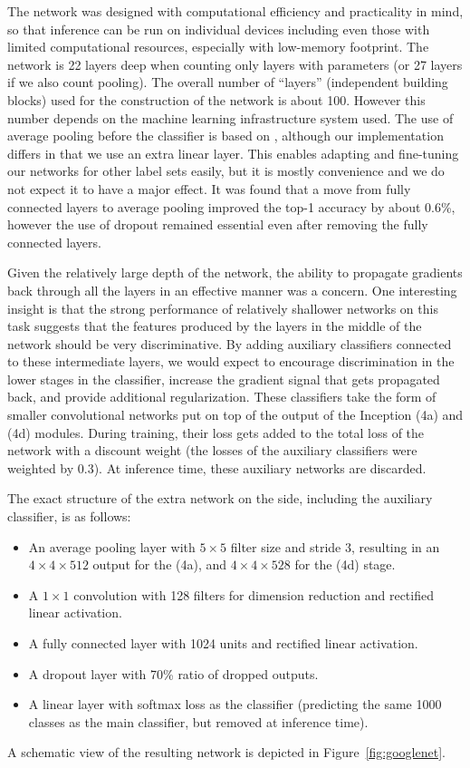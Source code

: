 The network was designed with computational efficiency and practicality in mind, so that inference can be run on individual devices including even those with limited computational resources, especially with low-memory footprint. The network is 22 layers deep when counting only layers with parameters (or 27 layers if we also count pooling). The overall number of “layers” (independent building blocks) used for the construction of the network is about 100. However this number depends on the machine learning infrastructure system used. The use of average pooling before the classifier is based on \cite{lin2013nin}, although our implementation differs in that we use an extra linear layer. This enables adapting and fine-tuning our networks for other label sets easily, but it is mostly convenience and we do not expect it to have a major effect. It was found that a move from fully connected layers to average pooling improved the top-1 accuracy by about 0.6\%, however the use of dropout remained essential even after removing the fully connected layers.

Given the relatively large depth of the network, the ability to propagate gradients back through all the layers in an effective manner was a concern. One interesting insight is that the strong performance of relatively shallower networks on this task suggests that the features produced by the layers in the middle of the network should be very discriminative. By adding auxiliary classifiers connected to these intermediate layers, we would expect to encourage discrimination in the lower stages in the classifier, increase the gradient signal that gets propagated back, and provide additional regularization. These classifiers take the form of smaller convolutional networks put on top of the output of the Inception (4a) and (4d) modules. During training, their loss gets added to the total loss of the network with a discount weight (the losses of the auxiliary classifiers were weighted by 0.3). At inference time, these auxiliary networks are discarded.

The exact structure of the extra network on the side, including the auxiliary classifier, is as follows:
\begin{itemize}
\item An average pooling layer with $5{\times}5$ filter size and stride $3$, resulting in an $4{\times}4{\times}512$ output for the (4a), and $4{\times}4{\times}528$ for the (4d) stage.
\item A $1{\times}1$ convolution with 128 filters for dimension reduction and rectified linear activation.
\item A fully connected layer with 1024 units and rectified linear activation.
\item A dropout layer with 70\% ratio of dropped outputs.
\item A linear layer with softmax loss as the classifier (predicting the same 1000 classes as the main classifier, but removed at inference time). 
\end{itemize}

A schematic view of the resulting network is depicted in Figure~\ref{fig:googlenet}.
